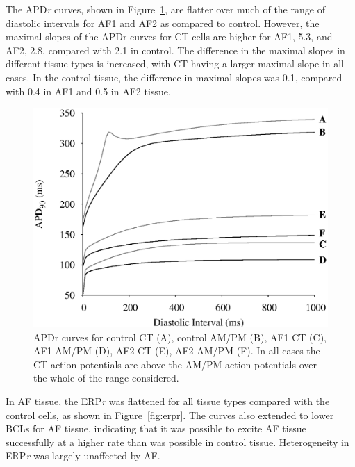 The APD\emph{r} curves, shown in Figure~\ref{fig:apdr}, are flatter over much
of the range of diastolic intervals for AF1 and AF2 as compared to
control.  However, the maximal slopes
of the APDr curves for CT cells are higher for AF1, 5.3, and AF2, 2.8,
compared with 2.1 in control.  The difference in the maximal slopes in
different tissue types is increased, with CT having a larger maximal
slope in all cases.  In the control tissue, the difference in maximal
slopes was 0.1, compared with 0.4 in AF1 and 0.5 in AF2 tissue.

\begin{figure}[tb]
\centering
\includegraphics{figures/toolkit/afer/2_apdr}
\caption[AFER APDr curves]{APDr curves for control CT (A), control AM/PM (B), AF1 CT (C),
AF1 AM/PM (D), AF2 CT (E), AF2 AM/PM (F). In all cases the CT action
potentials are above the AM/PM action potentials over the whole of the
range considered.}
\label{fig:apdr}
\end{figure}

In AF tissue, the ERP\emph{r} was flattened for all tissue types compared with
the control cells, as shown in Figure~\ref{fig:erpr}.  The curves also extended
to lower BCLs for AF tissue, indicating that it was possible to excite AF tissue
successfully at a higher rate than was possible in control tissue.
Heterogeneity in ERP\emph{r} was largely unaffected by AF.

